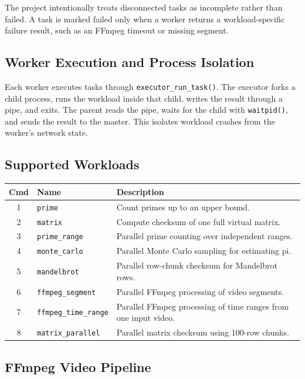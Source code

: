 \documentclass[12pt,a4paper]{article}
\begin{document}
The project intentionally treats disconnected tasks as incomplete rather than failed. A task is marked failed only when a worker returns a workload-specific failure result, such as an FFmpeg timeout or missing segment.

\subsection{Worker Execution and Process Isolation}

Each worker executes tasks through \texttt{executor\_run\_task()}. The executor forks a child process, runs the workload inside that child, writes the result through a pipe, and exits. The parent reads the pipe, waits for the child with \texttt{waitpid()}, and sends the result to the master. This isolates workload crashes from the worker's network state.

\subsection{Supported Workloads}

\begin{center}
\begin{tabular}{clp{7.5cm}}
\toprule
\textbf{Cmd} & \textbf{Name} & \textbf{Description} \\
\midrule
1 & \texttt{prime} & Count primes up to an upper bound. \\
2 & \texttt{matrix} & Compute checksum of one full virtual matrix. \\
3 & \texttt{prime\_range} & Parallel prime counting over independent ranges. \\
4 & \texttt{monte\_carlo} & Parallel Monte Carlo sampling for estimating pi. \\
5 & \texttt{mandelbrot} & Parallel row-chunk checksum for Mandelbrot rows. \\
6 & \texttt{ffmpeg\_segment} & Parallel FFmpeg processing of video segments. \\
7 & \texttt{ffmpeg\_time\_range} & Parallel FFmpeg processing of time ranges from one input video. \\
8 & \texttt{matrix\_parallel} & Parallel matrix checksum using 100-row chunks. \\
\bottomrule
\end{tabular}
\end{center}

\subsection{FFmpeg Video Pipeline}
\end{document}

